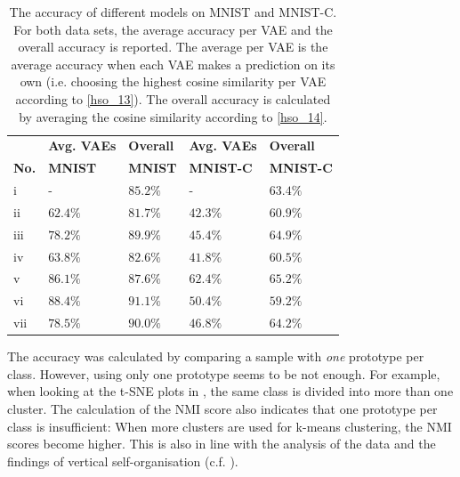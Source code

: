 \begin{table}[h] 
    \centering
	 \begin{tabular}{l l l l l}
	 	& \textbf{Avg. VAEs} & \textbf{Overall} & \textbf{Avg. VAEs} & \textbf{Overall}\\
    	\textbf{No.} & \textbf{MNIST} & \textbf{MNIST} & \textbf{MNIST-C} & \textbf{MNIST-C}\\
        \hline
		i & - & $85.2\%$ & - & $63.4\%$ \\
		ii & $62.4\%$ & $81.7\%$ & $42.3\%$ & $60.9\%$ \\
		iii & $78.2\%$ & $89.9\%$ & $45.4\%$ & $64.9\%$ \\
		iv & $63.8\%$ & $82.6\%$ & $41.8\%$ & $60.5\%$  \\
		v & $86.1\%$ & $87.6\%$ & $62.4\%$ & $65.2\%$ \\
		vi & $88.4\%$ & $91.1\%$ & $50.4\%$ & $59.2\%$ \\
		vii & $78.5\%$ & $90.0\%$ & $46.8\%$ & $64.2\%$ \\
    \end{tabular}
    \caption[Accuracy of different architectures on MNIST and MNIST-C]{The accuracy of different models on MNIST and MNIST-C. For both data sets, the average accuracy per VAE and the overall accuracy is reported. The average per VAE is the average accuracy when each VAE makes a prediction on its own (i.e. choosing the highest cosine similarity per VAE according to \eqref{hso_13}). The overall accuracy is calculated by averaging the cosine similarity according to \eqref{hso_14}.}
\end{table}

The accuracy was calculated by comparing a sample with \emph{one} prototype per class. However, using only one prototype seems to be not enough. For example, when looking at the t-SNE plots in , the same class is divided into more than one cluster. The calculation of the NMI score also indicates that one prototype per class is insufficient: When more clusters are used for k-means clustering, the NMI scores become higher. This is also in line with the analysis of the data and the findings of vertical self-organisation (c.f. ).






